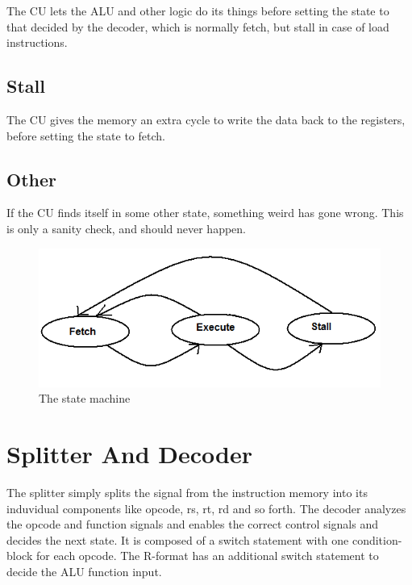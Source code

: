 The CU lets the ALU and other logic do its things before setting the state to
that decided by the decoder, which is normally fetch, but stall in case of load
instructions.

\subsection{Stall}

The CU gives the memory an extra cycle to write the data back to the registers,
before setting the state to fetch.

\subsection{Other}

If the CU finds itself in some other state, something weird has gone wrong.
This is only a sanity check, and should never happen.

\begin{figure}[ht] \centering
\includegraphics[scale=0.5]{figures/controlunitstatemachine.png}
\caption{\label{fig:stateMachine}The state machine} \end{figure}

\section{Splitter And Decoder}

The splitter simply splits the signal from the instruction memory into its
induvidual components like opcode, rs, rt, rd and so forth.  The decoder
analyzes the opcode and function signals and enables the correct control signals
and decides the next state.  It is composed of a switch statement with one
condition-block for each opcode.  The R-format has an additional switch
statement to decide the ALU function input.

